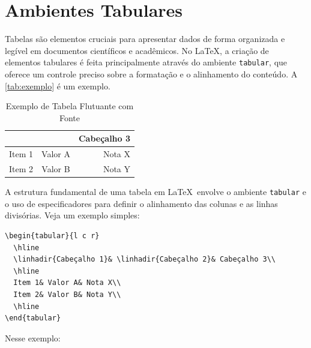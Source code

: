 \section{Ambientes Tabulares}

Tabelas são elementos cruciais para apresentar dados de forma organizada e legível em documentos científicos e acadêmicos. No \LaTeX, a criação de elementos tabulares é feita principalmente através do ambiente \texttt{tabular}, que oferece um controle preciso sobre a formatação e o alinhamento do conteúdo. A \autoref{tab:exemplo} é um exemplo.

\begin{table}[h!]
	\centering
	\caption{Exemplo de Tabela Flutuante com Fonte}\label{tab:exemplo}
	\begin{tabular}{l c r}
		\hline
		\linhadir{Cabeçalho 1} & \linhadir{Cabeçalho 2} & Cabeçalho 3 \\
		\hline
		Item 1 & Valor A & Nota X \\
		Item 2 & Valor B & Nota Y \\
		\hline
	\end{tabular}
	\vspace{.3cm}
\end{table}

A estrutura fundamental de uma tabela em \LaTeX\  envolve o ambiente \texttt{tabular} e o uso de especificadores para definir o alinhamento das colunas e as linhas divisórias. Veja um exemplo simples:

\begin{lstlisting}[language={[LaTeX]TeX}]
\begin{tabular}{l c r}
  \hline
  \linhadir{Cabeçalho 1}& \linhadir{Cabeçalho 2}& Cabeçalho 3\\
  \hline
  Item 1& Valor A& Nota X\\
  Item 2& Valor B& Nota Y\\
  \hline
\end{tabular}
\end{lstlisting}
Nesse exemplo:

